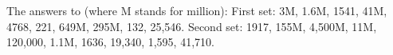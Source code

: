 










\bigskip

\noindent The answers to  (where M stands for million):
First set: 3M, 1.6M, 1541, 41M, 4768, 221, 649M, 295M, 132, 25,546.
Second set: 1917, 155M, 4,500M, 11M, 120,000, 1.1M, 1636, 19,340, 1,595, 41,710.
